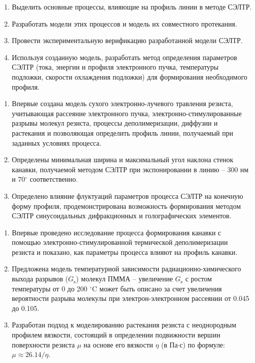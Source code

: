 \begin{enumerate}
	\item Выделить основные процессы, влияющие на профиль линии в методе СЭЛТР.
	\item Разработать модели этих процессов и модель их совместного протекания.
	\item Провести экспериментальную верификацию разработанной модели СЭЛТР.
	\item Используя созданную модель, разработать метод определения параметров СЭЛТР (тока, энергии и профиля электронного пучка, температуры подложки, скорости охлаждения подложки) для формирования необходимого профиля.	
\end{enumerate}


\begin{enumerate}
	\item Впервые создана модель сухого электронно-лучевого травления резиста, учитывающая рассеяние электронного пучка, электронно-стимулированные разрывы молекул резиста, процессы деполимеризации, диффузии и растекания и позволяющая определить профиль линии, получаемый при заданных условиях процесса.
	\item Определены минимальная ширина и максимальный угол наклона стенок канавки, получаемой методом СЭЛТР при экспонировании в линию -- 300 нм и 70$^\circ$ соответственно.
	\item Определено влияние флуктуаций параметров процесса СЭЛТР на конечную форму профиля, продемонстрирована возможность формирования методом СЭЛТР синусоидальных дифракционных и голографических элементов.
\end{enumerate}


\novelty
\begin{enumerate}
	\item Впервые проведено исследование процесса формирования канавки с помощью электронно-стимулированной термической деполимеризации резиста и показано, как параметры процесса влияют на профиль канавки.
	\item Предложена модель температурной зависимости радиационно-химического выхода разрывов ($G_\mathrm{s}$) молекул ПММА -- увеличение $G_\mathrm{s}$ с ростом температуры от 0 до 200 $^\circ$C может быть описано за счет увеличения вероятности разрыва молекулы при электрон-электронном рассеянии от 0.045 до 0.105.
	\item Разработан подход к моделированию растекания резиста с неоднородным профилем вязкости, состоящий в определении подвижности вершин поверхности резиста $\mu$ на основе его вязкости $\eta$ (в Па$\cdot$с) по формуле: $\mu \approx 26.14 / \eta$.
\end{enumerate}


